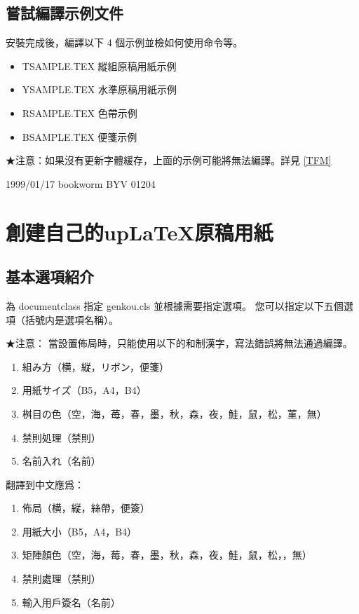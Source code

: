 \documentclass[a4,11pt,uplatex,openleft]{jsarticle}
\begin{document}
\clearpage

\subsection{嘗試編譯示例文件}
安裝完成後，編譯以下 4 個示例並檢如何使用命令等。
\begin{itemize}
\item TSAMPLE.TEX \quad 縱組原稿用紙示例
\item YSAMPLE.TEX \quad 水準原稿用紙示例
\item RSAMPLE.TEX \quad 色帶示例
\item BSAMPLE.TEX \quad 便箋示例
\end{itemize}

★注意：如果沒有更新字體緩存，上面的示例可能將無法編譯。詳見 \ref{TFM}

1999/01/17 bookworm BYV 01204

\section{創建自己的up\LaTeX 原稿用紙}

\subsection{基本選項紹介}
\par 為 documentclass 指定 genkou.cls 並根據需要指定選項。
您可以指定以下五個選項（括號内是選項名稱）。
\par ★注意： 當設置佈局時，只能使用以下的和制漢字，寫法錯誤將無法通過編譯。
\begin{enumerate}
\item 組み方（横，縦，リボン，便箋）
\item 用紙サイズ（B5，A4，B4）
\item 桝目の色（空，海，苺，春，墨，秋，森，夜，鮭，鼠，松，菫，無）
\item 禁則処理（禁則）
\item 名前入れ（名前）
\end{enumerate}

翻譯到中文應爲：
\begin{enumerate}
\item 佈局（横，縦，絲帶，便簽）
\item 用紙大小（B5，A4，B4）
\item 矩陣顏色（空，海，莓，春，墨，秋，森，夜，鮭，鼠，松，，無）
\item 禁則處理（禁則）
\item 輸入用戶簽名（名前）
\end{enumerate}
\end{document}
